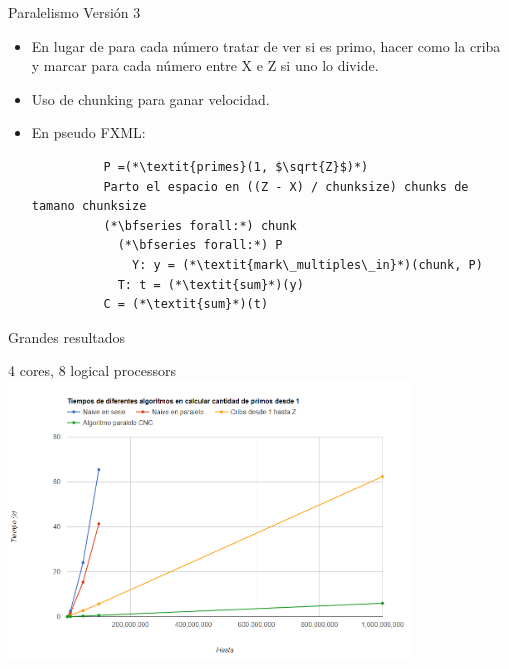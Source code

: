 \documentclass[compress]{beamer}
\begin{document}
\begin{frame}[fragile]{Paralelismo Versión 3}
  \begin{itemize}
    \setlength\itemsep{1em}
    \item<1-> En lugar de para cada número tratar de ver si es primo, hacer como la criba y marcar para cada número entre X e Z si uno lo divide.
    \item<2-> Uso de chunking para ganar velocidad.
    \item<3-> En pseudo FXML:
      \begin{lstlisting}
          P =(*\textit{primes}(1, $\sqrt{Z}$)*)
          Parto el espacio en ((Z - X) / chunksize) chunks de tamano chunksize
          (*\bfseries forall:*) chunk
            (*\bfseries forall:*) P
              Y: y = (*\textit{mark\_multiples\_in}*)(chunk, P)
            T: t = (*\textit{sum}*)(y)
          C = (*\textit{sum}*)(t)
      \end{lstlisting}
  \end{itemize}
\end{frame}

\begin{frame}{Grandes resultados}
  \begin{center}
  {4 cores, 8 logical processors}
  \\
  \includegraphics[width=0.8\textwidth]{imagenes/todoJulian.png}%
  \end{center}
\end{frame}
\end{document}
